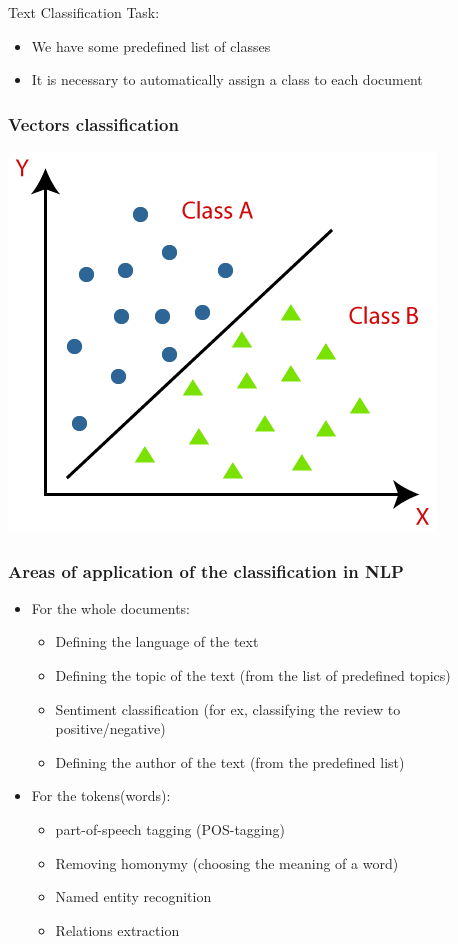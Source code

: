 \documentclass[svgnames]{beamer}
\begin{document}
\begin{frame}{Text Classification}
  Task:
  \begin{itemize}
  \item We have some predefined list of classes
  \item It is necessary to automatically assign a class to each document
  \end{itemize}
\end{frame}

\begin{frame}
  \frametitle{Vectors classification}
  \centering
  \includegraphics[height=.8\textheight]{classification-algorithm-in-machine-learning}
\end{frame}

\begin{frame}
  \frametitle{Areas of application of the classification in NLP}
  \begin{itemize}
  \item For the whole documents:
    \begin{itemize}
    \item  Defining the language of the text
    \item Defining the topic of the text (from the list of predefined topics)
    \item Sentiment classification (for ex, classifying the review to positive/negative)
    \item Defining the author of the text (from the predefined list)
    \end{itemize}
  \item For the tokens(words):
    \begin{itemize}
    \item part-of-speech tagging (POS-tagging)
    \item Removing homonymy (choosing the meaning of a word)
    \item Named entity recognition
    \item Relations extraction
    \end{itemize}
  \end{itemize}
\end{frame}
\end{document}
